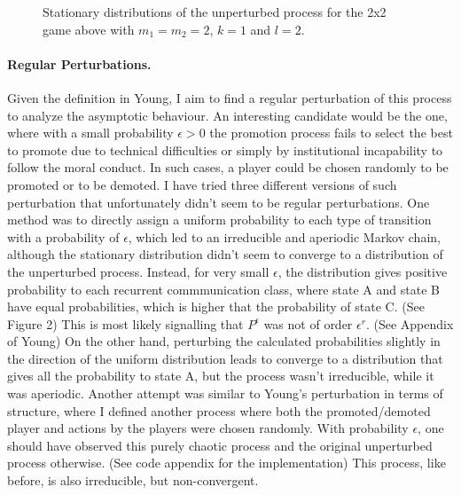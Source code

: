\documentclass[11pt, a4paper, leqno]{article}
\begin{document}
\begin{figure}
    \centering
    \hfill  %
    \hfill  %

    \caption{Stationary distributions of the unperturbed process for the 2x2 game above with $m_1=m_2=2$, $k=1$ and $l=2$.}

\end{figure}

\paragraph{Regular Perturbations.}
Given the definition in Young, I aim to find a regular perturbation of this 
process to analyze the asymptotic behaviour. An interesting candidate would be 
the one, where with a small probability $\epsilon > 0$ the promotion process fails 
to select the best to promote due to technical difficulties or simply by 
institutional incapability to follow the moral conduct. In such cases, a player 
could be chosen randomly to be promoted or to be demoted. I have tried three 
different versions of such perturbation that unfortunately didn't seem to be 
regular perturbations. One method was to directly assign a uniform probability 
to each type of transition with a probability of $\epsilon$, which led to an 
irreducible and aperiodic Markov chain, although the stationary distribution 
didn't seem to converge to a distribution of the unperturbed process. Instead, 
for very small $\epsilon$, the distribution gives positive probability to each
recurrent commmunication class, where state A and state B have equal probabilities,
which is higher that the probability of state C. (See Figure 2) This is most likely signalling 
that $P^\epsilon$ was not of order $\epsilon^r$. (See Appendix of Young) On the 
other hand, perturbing the calculated probabilities slightly in the direction of 
the uniform distribution leads to converge to a distribution that gives all the 
probability to state A, but the process wasn't irreducible, while it was aperiodic.
Another attempt was similar to Young's perturbation in terms of structure, where
I defined another process where both the promoted/demoted player and actions by 
the players were chosen randomly. With probability $\epsilon$, one should have 
observed this purely chaotic process and the original unperturbed process 
otherwise. (See code appendix for the implementation) This process, like before,
is also irreducible, but non-convergent.
\end{document}
